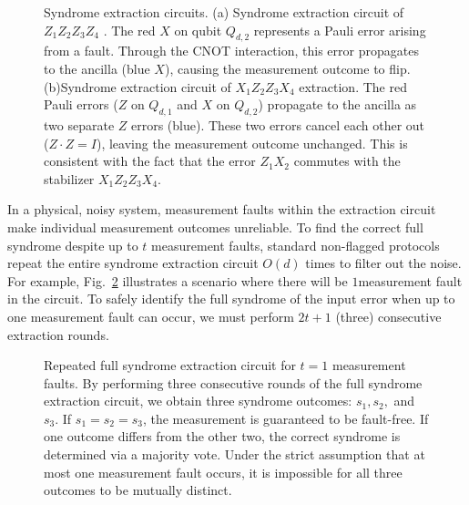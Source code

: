 \documentclass[acmsmallw,review]{acmart}
\begin{document}
\begin{figure}[h]
    \caption{Syndrome extraction circuits. 
    (a) Syndrome extraction circuit of $Z_1Z_2Z_3Z_4$ . The red $X$ on qubit $Q_{d,2}$ represents a Pauli error arising from a fault. Through the CNOT interaction, this error propagates to the ancilla (blue $X$), causing the measurement outcome to flip.
    (b)Syndrome extraction circuit of $X_1Z_2Z_3X_4$ extraction. The red Pauli errors ($Z$ on $Q_{d,1}$ and $X$ on $Q_{d,2}$) propagate to the ancilla as two separate $Z$ errors (blue). These two errors cancel each other out ($Z \cdot Z = I$), leaving the measurement outcome unchanged. This is consistent with the fact that the error $Z_1 X_2$ commutes with the stabilizer $X_1 Z_2 Z_3 X_4$.}
    \label{fig:syndrome-extraction-circuits-2}
\end{figure}
 


In a physical, noisy system, measurement faults within the extraction circuit make individual measurement outcomes unreliable. To find the correct full syndrome despite up to $t$ measurement faults, standard non-flagged protocols repeat the entire syndrome extraction circuit $O(d)$ times to filter out the noise. For example, Fig.~\ref{fig:repeated_extraction_bundled_3rounds} illustrates a scenario where there will be $1$measurement fault in the circuit. To safely identify the full syndrome of the input error when up to one measurement fault can occur, we must perform $2t+1$ (three) consecutive extraction rounds.

\begin{figure}[h]
    
    \centering
    \caption{Repeated full syndrome extraction circuit for $t=1$ measurement faults. By performing three consecutive rounds of the full syndrome extraction circuit, we obtain three syndrome outcomes: $s_1, s_2,$ and $s_3$. If $s_1 = s_2 = s_3$, the measurement is guaranteed to be fault-free. If one outcome differs from the other two, the correct syndrome is determined via a majority vote. Under the strict assumption that at most one measurement fault occurs, it is impossible for all three outcomes to be mutually distinct.}
    \label{fig:repeated_extraction_bundled_3rounds}
\end{figure}
\end{document}
